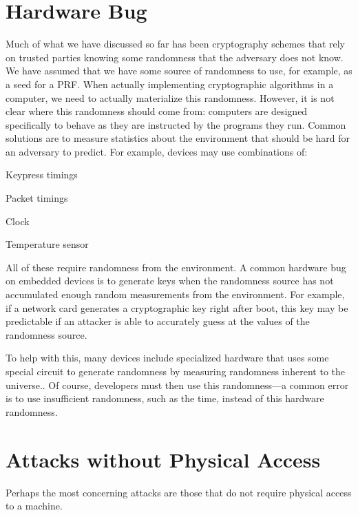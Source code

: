 \section{Hardware Bug}
Much of what we have discussed so far has been cryptography schemes that rely on trusted parties knowing some randomness that the adversary does not know. We have assumed that we have some source of  randomness to use, for example, as a seed for a PRF. When actually implementing cryptographic algorithms in a computer, we need to actually materialize this  randomness. However, it is not clear where this randomness should come from: computers are designed specifically to behave as they are instructed by the programs they run. Common solutions are to measure statistics about the environment that should be hard for an adversary to predict. For example, devices may use combinations of:

\begin{compactitem}
	\item Keypress timings
	\item Packet timings
	\item Clock
	\item Temperature sensor
\end{compactitem}

All of these require  randomness from the environment. A common hardware bug on embedded devices is to generate keys when the randomness source has not accumulated enough random measurements from the environment. For example, if a network card generates a cryptographic key right after boot, this key may be predictable if an attacker is able to accurately guess at the values of the randomness source.

To help with this, many devices include specialized hardware that uses some special circuit to generate randomness by measuring randomness inherent to the universe.. Of course, developers must then use this randomness---a common error is to use insufficient randomness, such as the time, instead of this hardware randomness.


\section{Attacks without Physical Access}
Perhaps the most concerning attacks are those that do not require physical access to a machine.

